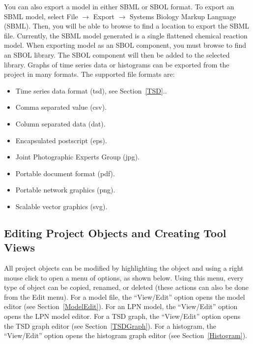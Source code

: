 \documentclass[titlepage,11pt]{article}
\begin{document}
\noindent
You can also export a model in either SBML or SBOL format.  To export an SBML model, select File $\rightarrow$ Export $\rightarrow$ Systems Biology Markup Language (SBML).  Then, you will be able to browse to find a location to export the SBML file.  Currently, the SBML model generated is a single flattened chemical reaction model.  When exporting model as an SBOL component, you must browse to find an SBOL library.  The SBOL component will then be added to the selected library.  Graphs of time series data or histograms can be exported from the project in many formats.  The supported file formats are:  
\begin{itemize}
\item Time series data format (tsd), see Section~\ref{TSD}..
\item Comma separated value (csv).
\item Column separated data (dat).
\item Encapsulated postscript (eps). 
\item Joint Photographic Experts Group (jpg). 
\item Portable document format (pdf).
\item Portable network graphics (png). 
\item Scalable vector graphics (svg).
\end{itemize}

\clearpage

\subsection{Editing Project Objects and Creating Tool Views}

\noindent
All project objects can be modified by highlighting the object and using a right mouse click to open a menu of options, as shown below. Using this menu, every type of object can be copied, renamed, or deleted (these actions can also be done from the Edit menu).  For a model file, the ``View/Edit'' option opens the model editor (see Section~\ref{ModelEdit}).  For an LPN model, the ``View/Edit'' option opens the LPN model editor. 
For a TSD graph, the ``View/Edit'' option opens the TSD graph editor (see Section~\ref{TSDGraph}).  For a histogram, the ``View/Edit'' option opens the histogram graph editor 
(see Section~\ref{Histogram}).  
\end{document}
